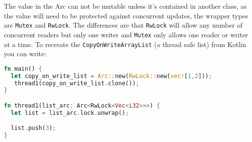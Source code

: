 \documentclass[a4paper,11pt]{article}
\begin{document}
The value in the Arc can not be mutable unless it's contained in another class, as the value will need to be protected against concurrent updates, the wrapper types are \lstinline[language=Rust]{Mutex} and \lstinline[language=Rust]{RwLock}. The differences are that \lstinline[language=Rust]{RwLock} will allow any number of concurrent readers but only one writer and \lstinline[language=Rust]{Mutex} only allows one reader or writer at a time. To recreate the \lstinline[language=Rust]{CopyOnWriteArrayList} (a thread safe list) from Kotlin you can write:
 \begin{lstlisting}[language=Rust,frame=single]
fn main() {
  let copy_on_write_list = Arc::new(RwLock::new(vec![1,2]));
   thread1(copy_on_write_list.clone());
}

fn thread1(list_arc: Arc<RwLock<Vec<i32>>>) {
  let list = list_arc.lock.unwrap();

  list.push(3);
}
\end{lstlisting}
\end{document}
